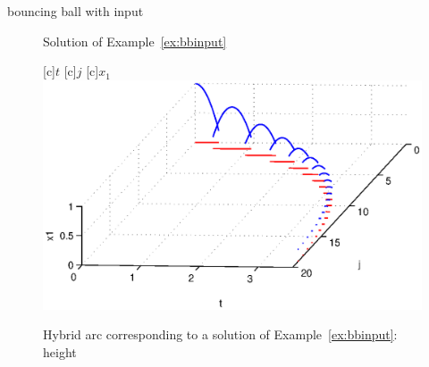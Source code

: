 \begin{example}{bouncing ball with input}
\begin{figure}[ht]
\begin{center}
\qquad
{}
\end{center}
\caption{Solution of Example~\ref{ex:bbinput}}
\end{figure}

\begin{figure}[ht]
  \begin{center}
  [c]{$t$}
  [c]{$j$}
  [c]{$x_1$}
    {\includegraphics[width=.8\textwidth]{figures/Examples/HybridArc1.eps}}
   \caption{Hybrid arc corresponding to a solution of Example~\ref{ex:bbinput}: height}
  \end{center}
\end{figure}








\end{example}
